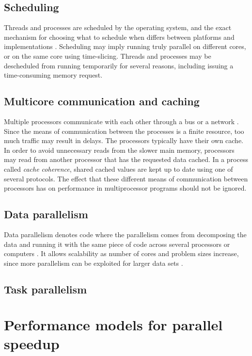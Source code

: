 \subsection{Scheduling}
Threads and processes are scheduled by the operating system, and the exact mechanism for choosing what to schedule when differs
between platforms and implementations \cite[p. 472]{herlihy_2012_art_taomprr}. Scheduling may imply running truly parallel
on different cores, or on the same core using time-slicing. Threads and processes may be descheduled from running temporarily for several
reasons, including issuing a time-consuming memory request.

\subsection{Multicore communication and caching}
Multiple processors communicate with each other through a bus or a network \cite[p. 472-476]{herlihy_2012_art_taomprr}. Since the
means of communication between the processes is a finite resource, too much traffic may result in delays. The processors typically
have their own cache. In order to avoid unnecessary reads from the slower main memory, processors may read from another processor
that has the requested data cached. In a process called \emph{cache coherence}, shared cached values are kept up to date using one
of several protocols. The effect that these different means of communication between processors has on performance in
multiprocessor programs should not be ignored.

\subsection{Data parallelism}
Data parallelism denotes code where the parallelism comes from decomposing the data and running it with the same piece of code
across several processors or computers \cite{singh_2013_parallel_padpwprfmm}. It allows scalability as number of cores and problem
sizes increase, since more parallelism can be exploited for larger data sets \cite[p. 24]{mccool_2012_structured_spppfec}.

\subsection{Task parallelism}

\section{Performance models for parallel speedup}

